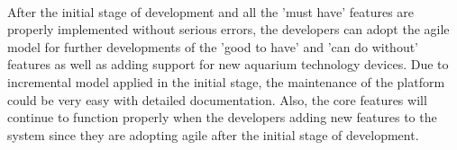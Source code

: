 \documentclass[paper=a4, fontsize=11pt]{scrartcl} %
\numberwithin{equation}{section} %
\numberwithin{figure}{section} %
\numberwithin{table}{section} %
\begin{document}
\paragraph{}After the initial stage of development and all the 'must have' features are properly implemented without serious errors, the developers can adopt the agile model for further developments of the 'good to have' and 'can do without' features as well as adding support for new aquarium technology devices. Due to incremental model applied in the initial stage, the maintenance of the platform could be very easy with detailed documentation. Also, the core features  will continue to function properly when the developers adding new features to the system since they are adopting agile after the initial stage of development.  


























\end{document}
